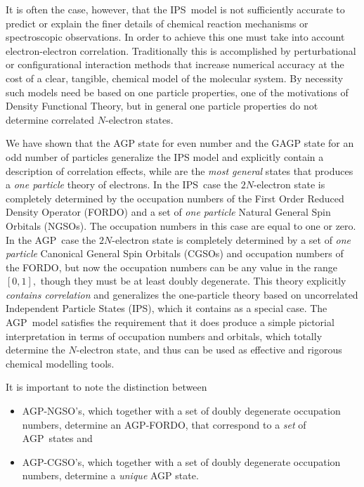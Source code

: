 \documentclass[aps,preprint]{revtex4}%
\begin{document}
It is often the case, however, that the IPS\ model is not sufficiently
accurate to predict or explain the finer details of chemical reaction
mechanisms or spectroscopic observations. In order to achieve this one must
take into account electron-electron correlation. Traditionally this is
accomplished by perturbational or configurational interaction methods that
increase numerical accuracy at the cost of a clear, tangible, chemical model
of the molecular system. By necessity such models need be based on one
particle properties, one of the motivations of Density Functional Theory, but
in general one particle properties do not determine correlated $N$-electron states.

We have shown \cite{Weiner & Ortiz 2003} that the AGP state for even number
and the GAGP state for an odd number of particles generalize the IPS model and
explicitly contain a description of correlation effects, while are the
\emph{most general} states that produces a \emph{one particle} theory of
electrons. In the IPS\ case the $2N$-electron state is completely determined
by the occupation numbers of the First Order Reduced Density Operator (FORDO)
and a set of \emph{one particle} Natural General Spin Orbitals (NGSOs). The
occupation numbers in this case are equal to one or zero. In the AGP\ case the
$2N$-electron state is completely determined by a set of \emph{one particle}
Canonical General Spin Orbitals (CGSOs) and occupation numbers of the FORDO,
but now the occupation numbers can be any value in the range $\left[
0,1\right]  ,$ though they must be at least doubly degenerate. This theory
explicitly \emph{contains correlation} and generalizes the one-particle theory
based on uncorrelated Independent Particle States (IPS), which it contains as
a special case. The AGP\ model satisfies the requirement that it does produce
a simple pictorial interpretation in terms of occupation numbers and orbitals,
which totally determine the $N$-electron state, and thus can be used as
effective and rigorous chemical modelling tools.

It is important to note the distinction between

\begin{itemize}
\item AGP-NGSO's, which together with a set of doubly degenerate occupation
numbers, determine an AGP-FORDO, that correspond to a \emph{set }of
AGP\ states and

\item AGP-CGSO's, which together with a set of doubly degenerate occupation
numbers, determine a \emph{unique} AGP state.
\end{itemize}
\end{document}
